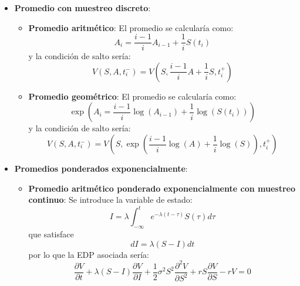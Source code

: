 \begin{itemize}
    \item \textbf{Promedio con muestreo discreto}:
    \begin{itemize}
        \item \textbf{Promedio aritmético}: El promedio se calcularía como:
        \begin{equation*}
            \boxed{A_i = \frac{i-1}{i} A_{i-1} + \frac{1}{i} S(t_i)}
        \end{equation*}
        y la condición de salto sería:
        \begin{equation*}
            \boxed{V(S,A,t_i^-) = V\left( S, \frac{i-1}{i} A + \frac{1}{i} S, t_i^+ \right)}
        \end{equation*}

        \item \textbf{Promedio geométrico}: El promedio se calcularía como:
        \begin{equation*}
            \boxed{\exp\left(A_i = \frac{i-1}{i} \log(A_{i-1}) + \frac{1}{i} \log(S(t_i))\right)}
        \end{equation*}
        y la condición de salto sería:
        \begin{equation*}
            \boxed{V(S,A,t_i^-) = V\left( S, \exp\left(\frac{i-1}{i} \log(A) + \frac{1}{i} \log(S)\right), t_i^+ \right)}
        \end{equation*}
    \end{itemize}

    \item \textbf{Promedios ponderados exponencialmente}:
    \begin{itemize}
        \item \textbf{Promedio aritmético ponderado exponencialmente con muestreo continuo}: Se introduce la variable de estado:
        \begin{equation*}
            \boxed{I = \lambda \int_{-\infty}^{t} e^{-\lambda (t - \tau)} S(\tau) d\tau}
        \end{equation*}
        que satisface
        \begin{equation*}
            dI = \lambda (S-I) dt
        \end{equation*}
        por lo que la EDP asociada sería:
        \begin{equation*}
            \boxed{\frac{\partial V}{\partial t} + \lambda (S-I) \frac{\partial V}{\partial I}  +  \frac{1}{2} \sigma^2 S^2 \frac{\partial^2 V}{\partial S^2} + r S \frac{\partial V}{\partial S} - rV = 0}
        \end{equation*}


\end{itemize}
\end{itemize}
